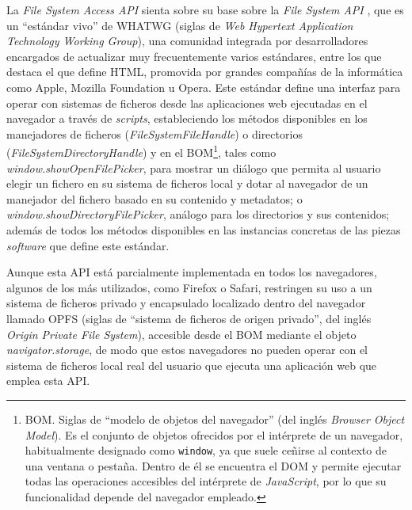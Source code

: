La \textit{File System Access API} sienta sobre su base sobre la \textit{File System API} \cite{FileSystemAPI}, que es un ``estándar vivo'' de WHATWG (siglas de \textit{Web Hypertext Application Technology Working Group}), una comunidad integrada por desarrolladores encargados de actualizar muy frecuentemente varios estándares, entre los que destaca el que define HTML, promovida por grandes compañías de la informática como Apple, Mozilla Foundation u Opera. Este estándar define una interfaz para operar con sistemas de ficheros desde las aplicaciones web ejecutadas en el navegador a través de \textit{scripts}, estableciendo los métodos disponibles en los manejadores de ficheros (\textit{FileSystemFileHandle}) o directorios (\textit{FileSystemDirectoryHandle}) y en el BOM\footnote{BOM. Siglas de ``modelo de objetos del navegador'' (del inglés \textit{Browser Object Model}). Es el conjunto de objetos ofrecidos por el intérprete de un navegador, habitualmente designado como \texttt{window}, ya que suele ceñirse al contexto de una ventana o pestaña. Dentro de él se encuentra el DOM y permite ejecutar todas las operaciones accesibles del intérprete de \textit{JavaScript}, por lo que su funcionalidad depende del navegador empleado.}, tales como \textit{window.showOpenFilePicker}, para mostrar un diálogo que permita al usuario elegir un fichero en su sistema de ficheros local y dotar al navegador de un manejador del fichero basado en su contenido y metadatos; o \textit{window.showDirectoryFilePicker}, análogo para los directorios y sus contenidos; además de todos los métodos disponibles en las instancias concretas de las piezas \textit{software} que define este estándar.

Aunque esta API está parcialmente implementada en todos los navegadores, algunos de los más utilizados, como Firefox o Safari, restringen su uso a un sistema de ficheros privado y encapsulado localizado dentro del navegador llamado OPFS (siglas de ``sistema de ficheros de origen privado'', del inglés \textit{Origin Private File System}), accesible desde el BOM mediante el objeto \textit{navigator.storage}, de modo que estos navegadores no pueden operar con el sistema de ficheros local real del usuario que ejecuta una aplicación web que emplea esta API.

